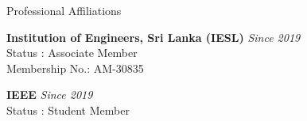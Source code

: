\documentclass[
	11pt, %
]{./assets/resume} %
\begin{document}








\begin{rSection}{Professional Affiliations}

	\textbf{Institution of Engineers, Sri Lanka (IESL)} \hfill \textit{Since 2019} \\ 
	Status : Associate Member \\
	Membership No.: AM-30835

	\textbf{IEEE} \hfill \textit{Since 2019} \\ 
	Status : Student Member

\end{rSection}




\end{document}

